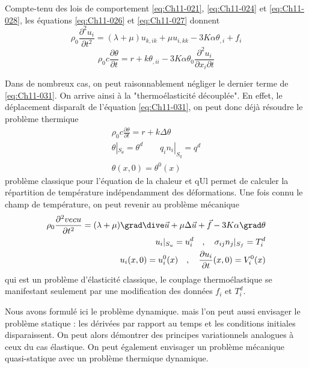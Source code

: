 Compte-tenu des lois de comportement \eqref{eq:Ch11-021}, \eqref{eq:Ch11-024} et \eqref{eq:Ch11-028}, les équa­tions \eqref{eq:Ch11-026} et \eqref{eq:Ch11-027} donnent 
\begin{equation}
    \rho_0 \frac{\partial^2 u_i}{\partial t^2} = (\lambda +\mu) u_{k,ik} + \mu u_{i,kk} - 3 K \alpha \theta_{,i} +f_i
    \label{eq:Ch11-030}
\end{equation}
\begin{equation}
    \rho_0 c \frac{\partial \theta}{\partial t} = r + k\theta_{,ii} - 3 K \alpha \theta_0 \frac{\partial^2 u_i}{\partial x_i \partial t}
    \label{eq:Ch11-031}
\end{equation}

Dans de nombreux cas, on peut raisonnablement négliger le dernier terme de \eqref{eq:Ch11-031}. On arrive ainsi à la "thermoélasticité découplée". En effet, le déplacement disparaît de l'équation \eqref{eq:Ch11-031}, on peut donc déjà résoudre le problème thermique 
\begin{equation}
  \begin{aligned}
    \rho_0 c \frac{\partial \theta}{\partial t} = r + k\Delta \theta \\
    \theta|_{S_\theta} = \theta^d \quad\quad  q_in_i|_{S_q} = q^d \\
    \theta (x,0) = \theta^0(x)
  \end{aligned}
    \label{eq:Ch11-032}
\end{equation}
problème classique pour l'équation de la chaleur et qUl permet de calculer la répartition de température indépendamment des déformations. Une fois con­nu le champ de température, on peut revenir au problème mécanique 
\begin{equation}
  \begin{aligned}
    \rho_0 \frac{\partial^2 vec{u}}{\partial t^2} = (\lambda + \mu) \grad \dive \vec{u} + \mu \Delta \vec{u} +\vec{f} - 3 K \alpha \grad \theta \\
    u_i|_{S_u} = u_i^d \quad,\quad  \sigma_{ij}n_j|_{S_f} = T_i^d \\
    u_i(x,0)= u_i^0(x) \quad,\quad  \frac{\partial u_i}{\partial t}(x,0) = V_i^0(x)
  \end{aligned}
    \label{eq:Ch11-033}
\end{equation}
qui est un problème d'élasticité classique, le couplage thermoélastique se 
manifestant seulement par une modification des données $f_i$ et $T_i^d$. 

Nous avons formulé ici le problème dynamique. mais l'on peut aussi envisager le problème statique : les dérivées par rapport au temps et les con­ditions initiales disparaissent. On peut alors démontrer des principes varia­tionnels analogues à ceux du cas élastique. On peut également envisager un problème mécanique quasi-statique avec un problème thermique dynamique. 

